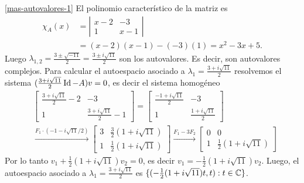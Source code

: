 \begin{enumerate}[resume,topsep=6pt,itemsep=.4cm]
    \ref{mas-autovalores-1} El polinomio característico de la matriz es
    \begin{align*}
        \chi_A(x) &= \left|\begin{matrix} x-2 & -3\\ 1 & x-1 \end{matrix} \right| \\ &= (x-2)(x-1)-(-3)(1) = x^2-3x+5.
    \end{align*}
    Luego $\lambda_{1,2}=\frac{3\pm\sqrt{-11}}{2} =\frac{3\pm i\sqrt{11}}{2}$ son los autovalores. Es decir, son autovalores complejos. Para calcular el autoespacio asociado a $\lambda_1=\frac{3+i\sqrt{11}}{2}$ resolvemos el sistema  $(\frac{3+i\sqrt{11}}{2}\operatorname{Id}-A)v=0$, es decir el sistema homogéneo     
    \begin{align*}
        &\begin{bmatrix} \frac{3+i\sqrt{11}}{2}-2 & -3\\ 1 & \frac{3+i\sqrt{11}}{2}-1 \end{bmatrix} = \begin{bmatrix} \frac{-1+i\sqrt{11}}{2} & -3\\ 1 & \frac{1+i\sqrt{11}}{2} \end{bmatrix} \\
        &\stackrel{F_1 \cdot (-1-i\sqrt{11}/2)}{\longrightarrow} \begin{bmatrix} 3 & \frac{3}2 (1+i\sqrt{11})\\ 1 & \frac{1}{2} (1+i\sqrt{11}) \end{bmatrix} \stackrel{F_1-3F_2}{\longrightarrow} \begin{bmatrix} 0 & 0\\ 1 & \frac{1}{2} (1+i\sqrt{11}) \end{bmatrix}
    \end{align*}
    Por lo tanto $v_1 + \frac{1}{2} (1+i\sqrt{11})v_2 =0$, es decir $v_1 = -\frac{1}{2} (1+i\sqrt{11})v_2$. Luego, el autoespacio asociado a $\lambda_1=\frac{3+i\sqrt{11}}{2}$ es $\{(-\frac{1}{2} (1+i\sqrt{11})t,t): t \in \mathbb C\}$.


\end{enumerate}
